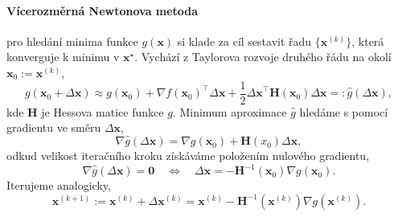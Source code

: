 \paragraph{Vícerozměrná Newtonova metoda} pro hledání minima funkce $g(\bm{x})$ si klade za cíl sestavit řadu $\{\bm{x}^{(k)}\}$, která konverguje k minimu v $\bm{x}^\star$. Vychází z Taylorova rozvoje druhého řádu na okolí $\bm{x}_0:=\bm{x}^{(k)}$,
\begin{equation}
    g(\bm{x}_0+\Delta\bm{x})\approx g(\bm{x}_0)+\nabla f(\bm{x}_0)^\top \Delta \bm{x}+\frac{1}{2}{\Delta \bm{x}}^\top \mathbf{H}(\bm{x}_0)\Delta\bm{x}=:\hat{g}(\Delta\bm{x}),
\end{equation}
kde $\mathbf{H}$ je Hessova matice funkce $g$. Minimum aproximace $\hat{g}$ hledáme s pomocí gradientu ve směru $\Delta\bm{x}$, 
\begin{equation}\label{eq:multivariable_newton_quadratic_of_step_gradient}
    \nabla \hat{g}(\Delta \bm{x})=\nabla g(\bm{x}_0)+\mathbf{H}(x_0)\Delta \bm{x},
\end{equation}
odkud velikost iteračního kroku získáváme položením nulového gradientu,
\begin{equation}
    \nabla \hat{g}(\Delta \bm{x})=\bm{0}\quad\Longleftrightarrow\quad \Delta \bm{x}=-\mathbf{H}^{-1}(\bm{x}_0)\nabla g(\bm{x}_0).
\end{equation}
Iterujeme analogicky,
\begin{equation}
    \bm{x}^{(k+1)}:=\bm{x}^{(k)}+\Delta \bm{x}^{(k)}=\bm{x}^{(k)}-\mathbf{H}^{-1}(\bm{x}^{(k)})\nabla g(\bm{x}^{(k)}).
\end{equation}

